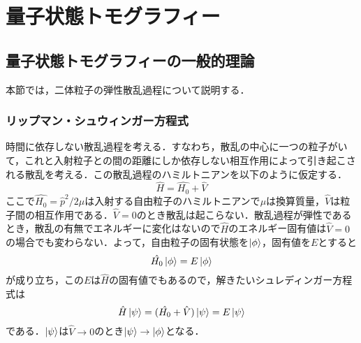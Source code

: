 \documentclass[11pt,a4j,notitlepage]{jreport}
\begin{document}
\chapter{量子状態トモグラフィー}
\section{量子状態トモグラフィーの一般的理論}
本節では，二体粒子の弾性散乱過程について説明する\cite{J.J. Sakurai}．

\subsection{リップマン・シュウィンガー方程式}

時間に依存しない散乱過程を考える．すなわち，散乱の中心に一つの粒子がいて，これと入射粒子との間の距離にしか依存しない相互作用によって引き起こされる散乱を考える．この散乱過程のハミルトニアンを以下のように仮定する．
\begin{equation}
	\hat{H}=\hat{H_{0}}+\hat{V}
	\label{eq2.1.1}
\end{equation}
ここで$\hat{H_{0}}=\hat{p}^2 / 2 \mu$は入射する自由粒子のハミルトニアンで$\mu$は換算質量，$\hat{V}$は粒子間の相互作用である．$\hat{V}=0$のとき散乱は起こらない．散乱過程が弾性であるとき，散乱の有無でエネルギーに変化はないので$\hat{H}$のエネルギー固有値は$\hat{V}=0$の場合でも変わらない．よって，自由粒子の固有状態を$\ket{\phi}$，固有値を$E$とすると
\begin{equation}
	\hat{H_0} \ket{\phi} = E \ket{\phi}
	\label{eq2.1.2}
\end{equation}
が成り立ち，この$E$は$\hat{H}$の固有値でもあるので，解きたいシュレディンガー方程式は
\begin{equation}
	\hat{H} \ket{\psi} = ( \hat{H_0} + \hat{V} ) \ket{\psi} = E \ket{\psi}
	\label{eq2.1.3}
\end{equation}
である．$\ket{\psi}$は$\hat{V} \rightarrow 0$のとき$\ket{\psi} \rightarrow \ket{\phi}$となる．
\end{document}
